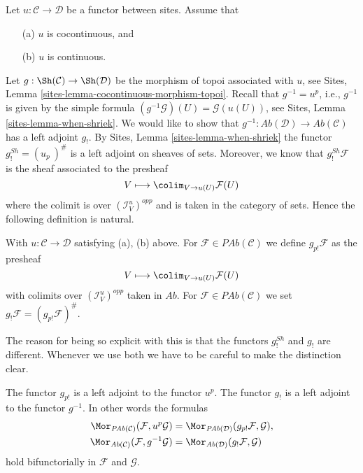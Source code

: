 \noindent
Let $u : \mathcal{C} \to \mathcal{D}$ be a functor between sites.
Assume that
\begin{enumerate}
\item[(a)] $u$ is cocontinuous, and
\item[(b)] $u$ is continuous.
\end{enumerate}
Let $g : \Sh(\mathcal{C}) \to \Sh(\mathcal{D})$ be the
morphism of topoi associated with $u$, see
Sites, Lemma \ref{sites-lemma-cocontinuous-morphism-topoi}.
Recall that $g^{-1} = u^p$, i.e., $g^{-1}$ is given by the simple formula
$(g^{-1}\mathcal{G})(U) = \mathcal{G}(u(U))$, see
Sites, Lemma \ref{sites-lemma-when-shriek}.
We would like to show that
$g^{-1} : \textit{Ab}(\mathcal{D}) \to \textit{Ab}(\mathcal{C})$
has a left adjoint $g_!$. By
Sites, Lemma \ref{sites-lemma-when-shriek}
the functor $g^{Sh}_! = (u_p\ )^\#$ is a left adjoint on sheaves of sets.
Moreover, we know that $g^{Sh}_!\mathcal{F}$ is the sheaf
associated to the presheaf
$$
V \longmapsto \colim_{V \to u(U)} \mathcal{F}(U)
$$
where the colimit is over $(\mathcal{I}_V^u)^{opp}$ and is taken in the
category of sets. Hence the following definition is natural.

\begin{definition}
\label{definition-g-shriek}
With $u : \mathcal{C} \to \mathcal{D}$ satisfying (a), (b) above.
For $\mathcal{F} \in \textit{PAb}(\mathcal{C})$ we define
{\it $g_{p!}\mathcal{F}$} as the presheaf
$$
V \longmapsto \colim_{V \to u(U)} \mathcal{F}(U)
$$
with colimits over $(\mathcal{I}_V^u)^{opp}$ taken in $\textit{Ab}$. For
$\mathcal{F} \in \textit{PAb}(\mathcal{C})$ we set
{\it $g_!\mathcal{F} = (g_{p!}\mathcal{F})^\#$}.
\end{definition}

\noindent
The reason for being so explicit with this is that the functors
$g^{Sh}_!$ and $g_!$ are different. Whenever we use both
we have to be careful to make the distinction clear.

\begin{lemma}
\label{lemma-g-shriek-adjoint}
The functor $g_{p!}$ is a left adjoint to the functor $u^p$.
The functor $g_!$ is a left adjoint to the functor $g^{-1}$.
In other words the formulas
\begin{align*}
\Mor_{\textit{PAb}(\mathcal{C})}(\mathcal{F}, u^p\mathcal{G})
& =
\Mor_{\textit{PAb}(\mathcal{D})}(g_{p!}\mathcal{F}, \mathcal{G}), \\
\Mor_{\textit{Ab}(\mathcal{C})}(\mathcal{F}, g^{-1}\mathcal{G})
& =
\Mor_{\textit{Ab}(\mathcal{D})}(g_!\mathcal{F}, \mathcal{G})
\end{align*}
hold bifunctorially in $\mathcal{F}$ and $\mathcal{G}$.
\end{lemma}

